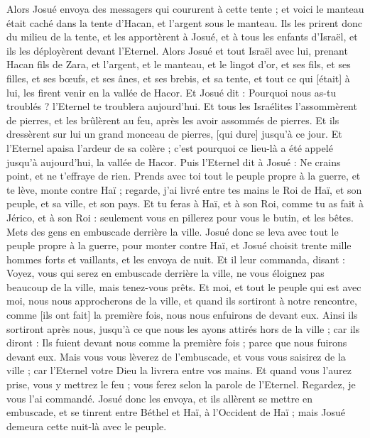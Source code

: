 \begin{multicols}{2}
Alors Josué envoya des messagers qui coururent à cette tente ; et voici le manteau était caché dans la tente d'Hacan, et l'argent sous le manteau.
Ils les prirent donc du milieu de la tente, et les apportèrent à Josué, et à tous les enfants d'Israël, et ils les déployèrent devant l'Eternel.
Alors Josué et tout Israël avec lui, prenant Hacan fils de Zara, et l'argent, et le manteau, et le lingot d'or, et ses fils, et ses filles, et ses bœufs, et ses ânes, et ses brebis, et sa tente, et tout ce qui [était] à lui, les firent venir en la vallée de Hacor.
Et Josué dit : Pourquoi nous as-tu troublés ? l'Eternel te troublera aujourd'hui. Et tous les Israélites l'assommèrent de pierres, et les brûlèrent au feu, après les avoir assommés de pierres.
Et ils dressèrent sur lui un grand monceau de pierres, [qui dure] jusqu'à ce jour. Et l'Eternel apaisa l'ardeur de sa colère ; c'est pourquoi ce lieu-là a été appelé jusqu'à aujourd'hui, la vallée de Hacor.
\VerseOne{}Puis l'Eternel dit à Josué : Ne crains point, et ne t'effraye de rien. Prends avec toi tout le peuple propre à la guerre, et te lève, monte contre Haï ; regarde, j'ai livré entre tes mains le Roi de Haï, et son peuple, et sa ville, et son pays.
Et tu feras à Haï, et à son Roi, comme tu as fait à Jérico, et à son Roi : seulement vous en pillerez pour vous le butin, et les bêtes. Mets des gens en embuscade derrière la ville.
Josué donc se leva avec tout le peuple propre à la guerre, pour monter contre Haï, et Josué choisit trente mille hommes forts et vaillants, et les envoya de nuit.
Et il leur commanda, disant : Voyez, vous qui serez en embuscade derrière la ville, ne vous éloignez pas beaucoup de la ville, mais tenez-vous prêts.
Et moi, et tout le peuple qui est avec moi, nous nous approcherons de la ville, et quand ils sortiront à notre rencontre, comme [ils ont fait] la première fois, nous nous enfuirons de devant eux.
Ainsi ils sortiront après nous, jusqu'à ce que nous les ayons attirés hors de la ville ; car ils diront : Ils fuient devant nous comme la première fois ; parce que nous fuirons devant eux.
Mais vous vous lèverez de l'embuscade, et vous vous saisirez de la ville ; car l'Eternel votre Dieu la livrera entre vos mains.
Et quand vous l'aurez prise, vous y mettrez le feu ; vous ferez selon la parole de l'Eternel. Regardez, je vous l'ai commandé.
Josué donc les envoya, et ils allèrent se mettre en embuscade, et se tinrent entre Béthel et Haï, à l'Occident de Haï ; mais Josué demeura cette nuit-là avec le peuple.

\end{multicols}
